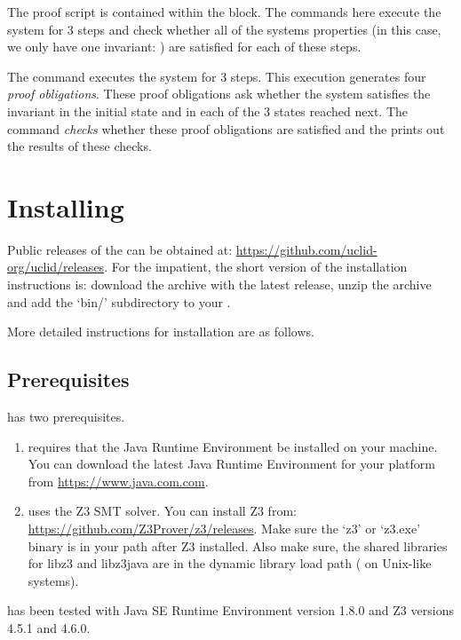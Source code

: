 The proof script is contained within the  block. The commands here execute the system for 3 steps and check whether all of the systems properties (in this case, we only have one invariant: ) are satisfied for each of these steps. 

The command  executes the system for 3 steps. This execution generates four \emph{proof obligations}. These proof obligations ask whether the system satisfies the invariant  in the initial state and in each of the 3 states reached next. The  command \emph{checks} whether these proof obligations are satisfied and the  prints out the results of these checks.

\section{Installing \uclid{}}

Public releases of the \uclid{} can be obtained at: \url{https://github.com/uclid-org/uclid/releases}. For the impatient, the short version of the installation instructions is: download the archive with the latest release, unzip the archive and add the `bin/' subdirectory to your . 

More detailed instructions for installation are as follows.

\subsection{Prerequisites}

\uclid{} has two prerequisites. 
\begin{enumerate}
    \item \uclid{} requires that the Java\texttrademark{} Runtime Environment be installed on your machine. You can download the latest Java Runtime Environment for your platform from \url{https://www.java.com.com}. 
\item \uclid{} uses the Z3 SMT solver. You can install Z3 from: \url{https://github.com/Z3Prover/z3/releases}. Make sure the `z3' or `z3.exe' binary is in your path after Z3 installed. Also make sure, the shared libraries for libz3 and libz3java are in the dynamic library load path ( on Unix-like systems).
\end{enumerate}

\uclid{} has been tested with Java\texttrademark{} SE Runtime Environment version 1.8.0 and Z3 versions 4.5.1 and 4.6.0.

